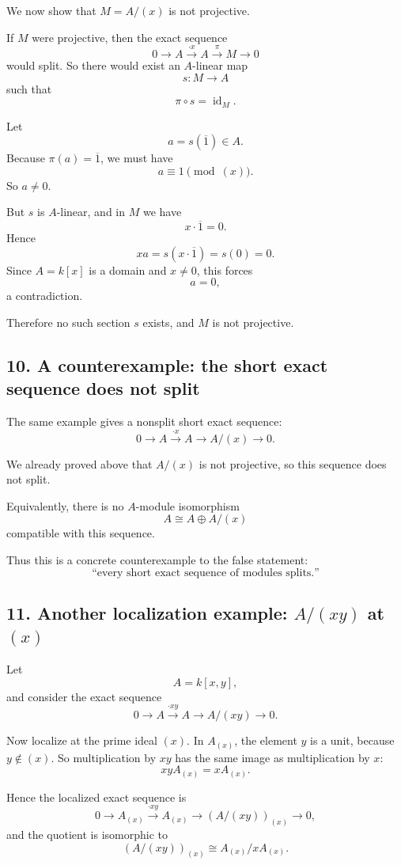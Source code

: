 \documentclass[12pt,a4paper]{article}
\theoremstyle{notespace}
\theoremstyle{definition}
\begin{document}
We now show that \(M=A/(x)\) is not projective.

If \(M\) were projective, then the exact sequence
\[
0 \longrightarrow A \xrightarrow{\cdot x} A \xrightarrow{\pi} M \longrightarrow 0
\]
would split.
So there would exist an \(A\)-linear map
\[
s:M\to A
\]
such that
\[
\pi\circ s=\operatorname{id}_M.
\]

Let
\[
a=s(\overline{1})\in A.
\]
Because \(\pi(a)=\overline{1}\), we must have
\[
a \equiv 1 \pmod{(x)}.
\]
So \(a\neq 0\).

But \(s\) is \(A\)-linear, and in \(M\) we have
\[
x\cdot \overline{1}=0.
\]
Hence
\[
x a = s(x\cdot \overline{1})=s(0)=0.
\]
Since \(A=k[x]\) is a domain and \(x\neq 0\), this forces
\[
a=0,
\]
a contradiction.

Therefore no such section \(s\) exists, and \(M\) is not projective.

\subsection{10. A counterexample: the short exact sequence does not split}

The same example gives a nonsplit short exact sequence:
\[
0 \longrightarrow A \xrightarrow{\cdot x} A \longrightarrow A/(x) \longrightarrow 0.
\]

We already proved above that \(A/(x)\) is not projective, so this sequence does not split.

Equivalently, there is no \(A\)-module isomorphism
\[
A \cong A \oplus A/(x)
\]
compatible with this sequence.

Thus this is a concrete counterexample to the false statement:
\[
\text{``every short exact sequence of modules splits.''}
\]

\subsection{11. Another localization example: \(A/(xy)\) at \((x)\)}

Let
\[
A=k[x,y],
\]
and consider the exact sequence
\[
0 \longrightarrow A \xrightarrow{\cdot xy} A \longrightarrow A/(xy) \longrightarrow 0.
\]

Now localize at the prime ideal \((x)\).
In \(A_{(x)}\), the element \(y\) is a unit, because \(y\notin (x)\).
So multiplication by \(xy\) has the same image as multiplication by \(x\):
\[
xyA_{(x)}=xA_{(x)}.
\]

Hence the localized exact sequence is
\[
0 \longrightarrow A_{(x)} \xrightarrow{\cdot xy} A_{(x)} \longrightarrow (A/(xy))_{(x)} \longrightarrow 0,
\]
and the quotient is isomorphic to
\[
(A/(xy))_{(x)} \cong A_{(x)}/xA_{(x)}.
\]
\end{document}
